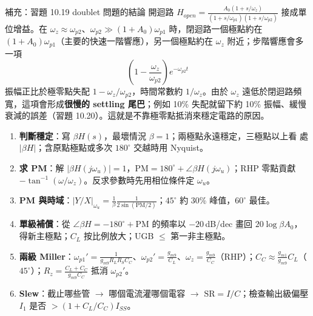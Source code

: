 \documentclass[11pt,a4paper]{article}
\newcommand{\PX}{\text{PX}}
\begin{document}
\begin{cbox}[boxgray]{補充：習題 10.19 doublet 問題的結論}
開迴路 $H_{open}=\frac{A_0(1+s/\omega_z)}{(1+s/\omega_{p1})(1+s/\omega_{p2})}$ 接成單位增益。在 $\omega_z\approx\omega_{p2}$、$\omega_{p2}\gg(1+A_0)\omega_{p1}$ 時，閉迴路一個極點約在 $(1+A_0)\omega_{p1}$（主要的快速一階響應），另一個極點約在 $\omega_z$ 附近；步階響應會多一項
\[\left(1-\frac{\omega_z}{\omega_{p2}}\right)e^{-\omega_{p2}t}\]
振幅正比於極零點失配 $1-\omega_z/\omega_{p2}$，時間常數約 $1/\omega_z$。由於 $\omega_z$ 遠低於閉迴路頻寬，這項會形成\textbf{很慢的 settling 尾巴}；例如 10\% 失配就留下約 10\% 振幅、緩慢衰減的誤差（習題 10.20）。這就是不靠極零點抵消來穩定電路的原因。
\end{cbox}

\begin{recipebox}[解題流程總整理]
\begin{enumerate}[leftmargin=2.2em]
  \item \textbf{判斷穩定}：寫 $\beta H(s)$，最壞情況 $\beta=1$；兩極點永遠穩定，三極點以上看 \PX{} 處 $|\beta H|$；含原點極點或多次 $180^\circ$ 交越時用 Nyquist。
  \item \textbf{求 PM}：解 $|\beta H(j\omega_u)|=1$，$\text{PM}=180^\circ+\angle\beta H(j\omega_u)$；RHP 零點貢獻 $-\tan^{-1}(\omega/\omega_z)$。反求參數時先用相位條件定 $\omega_u$。
  \item \textbf{PM 與時域}：$|Y/X|_{\omega_u}=\frac{1}{\beta}\frac{1}{2\sin(\text{PM}/2)}$；$45^\circ$ 約 30\% 峰值，$60^\circ$ 最佳。
  \item \textbf{單級補償}：從 $\angle\beta H=-180^\circ+\text{PM}$ 的頻率以 $-20$\,dB/dec 畫回 $20\log\beta A_0$，得新主極點；$C_L$ 按比例放大；UGB $\le$ 第一非主極點。
  \item \textbf{兩級 Miller}：$\omega_{p1}'=\frac{1}{g_{m9}R_LR_SC_C}$、$\omega_{p2}'=\frac{g_{m9}}{C_L}$、$\omega_z=\frac{g_{m9}}{C_C}$（RHP）；$C_C\approx\frac{g_{m1}}{g_{m9}}C_L$（$45^\circ$）；$R_z=\frac{C_L+C_C}{g_{m9}C_C}$ 抵消 $\omega_{p2}'$。
  \item \textbf{Slew}：截止哪些管 $\to$ 哪個電流灌哪個電容 $\to$ $\text{SR}=I/C$；檢查輸出級偏壓 $I_1$ 是否 $>(1+C_L/C_C)I_{SS}$。
\end{enumerate}
\end{recipebox}
\end{document}
